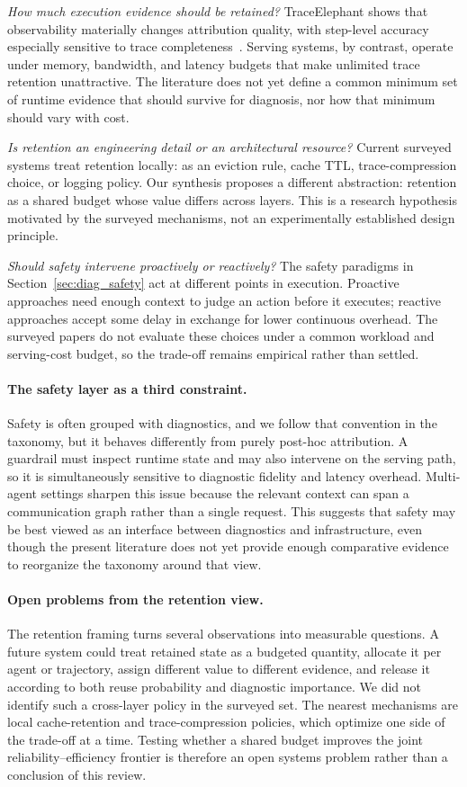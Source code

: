 \emph{How much execution evidence should be retained?} TraceElephant shows that observability materially changes attribution quality, with step-level accuracy especially sensitive to trace completeness~\cite{traceelephant2026}. Serving systems, by contrast, operate under memory, bandwidth, and latency budgets that make unlimited trace retention unattractive. The literature does not yet define a common minimum set of runtime evidence that should survive for diagnosis, nor how that minimum should vary with cost.

\emph{Is retention an engineering detail or an architectural resource?} Current surveyed systems treat retention locally: as an eviction rule, cache TTL, trace-compression choice, or logging policy. Our synthesis proposes a different abstraction: retention as a shared budget whose value differs across layers. This is a research hypothesis motivated by the surveyed mechanisms, not an experimentally established design principle.

\emph{Should safety intervene proactively or reactively?} The safety paradigms in Section~\ref{sec:diag_safety} act at different points in execution. Proactive approaches need enough context to judge an action before it executes; reactive approaches accept some delay in exchange for lower continuous overhead. The surveyed papers do not evaluate these choices under a common workload and serving-cost budget, so the trade-off remains empirical rather than settled.

\paragraph*{The safety layer as a third constraint.}
Safety is often grouped with diagnostics, and we follow that convention in the taxonomy, but it behaves differently from purely post-hoc attribution. A guardrail must inspect runtime state and may also intervene on the serving path, so it is simultaneously sensitive to diagnostic fidelity and latency overhead. Multi-agent settings sharpen this issue because the relevant context can span a communication graph rather than a single request. This suggests that safety may be best viewed as an interface between diagnostics and infrastructure, even though the present literature does not yet provide enough comparative evidence to reorganize the taxonomy around that view.

\paragraph*{Open problems from the retention view.}
The retention framing turns several observations into measurable questions. A future system could treat retained state as a budgeted quantity, allocate it per agent or trajectory, assign different value to different evidence, and release it according to both reuse probability and diagnostic importance. We did not identify such a cross-layer policy in the surveyed set. The nearest mechanisms are local cache-retention and trace-compression policies, which optimize one side of the trade-off at a time. Testing whether a shared budget improves the joint reliability--efficiency frontier is therefore an open systems problem rather than a conclusion of this review.

